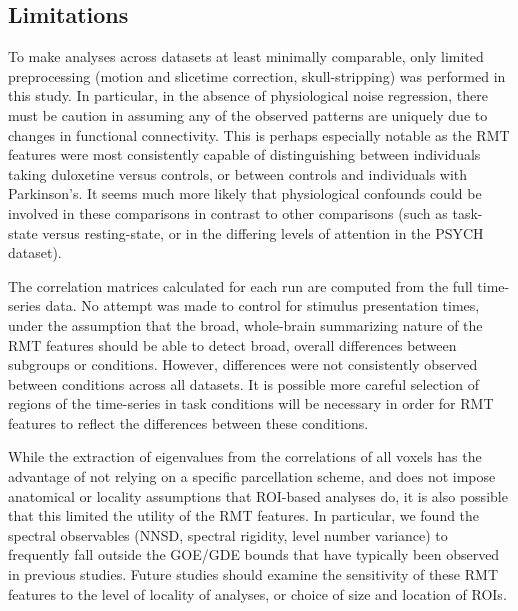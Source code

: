 \documentclass[NETN,manuscript]{stjour-new}
\begin{document}
\subsection{Limitations}

To make analyses across datasets at least minimally comparable, only limited preprocessing (motion
and slicetime correction, skull-stripping) was performed in this study. In particular, in the
absence of physiological noise regression, there must be caution in assuming any of the observed
patterns are uniquely due to changes in functional connectivity. This is perhaps especially notable
as the RMT features were most consistently capable of distinguishing between individuals taking
duloxetine versus controls, or between controls and individuals with Parkinson's. It seems much more
likely that physiological confounds could be involved in these comparisons in contrast to other
comparisons (such as task-state versus resting-state, or in the differing levels of attention in the
PSYCH dataset).

The correlation matrices calculated for each run are computed from the full time-series data. No
attempt was made to control for stimulus presentation times, under the assumption that the broad,
whole-brain summarizing nature of the RMT features should be able to detect broad, overall
differences between subgroups or conditions. However, differences were not consistently observed
between conditions across all datasets. It is possible more careful selection of regions of the
time-series in task conditions will be necessary in order for RMT features to reflect the
differences between these conditions.

While the extraction of eigenvalues from the correlations of all voxels has the advantage of not
relying on a specific parcellation scheme, and does not impose anatomical or locality assumptions
that ROI-based analyses do, it is also possible that this limited the utility of the RMT features.
In particular, we found the spectral observables (NNSD, spectral rigidity, level number variance) to
frequently fall outside the GOE/GDE bounds that have typically been observed in previous studies.
Future studies should examine the sensitivity of these RMT features to the level of locality of
analyses, or choice of size and location of ROIs.

\end{document}
